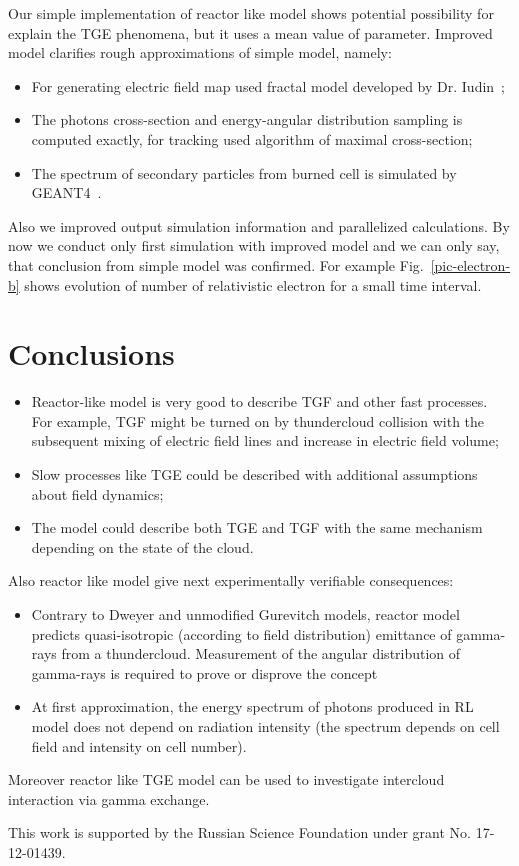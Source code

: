 \documentclass[%
 aip,
cp,  %
 amsmath,amssymb,%
 reprint,%
]{revtex4-2}
\begin{document}
Our simple implementation of reactor like model shows potential possibility for explain the TGE phenomena, but it uses a mean value of parameter. 
Improved model clarifies rough approximations of simple model, namely:
\begin{itemize}
	\item For generating electric field map used fractal model developed by Dr. Iudin~\cite{Iudin:2018};
	\item The photons cross-section and energy-angular distribution sampling  is computed exactly, for tracking used algorithm of maximal cross-section;
	\item The spectrum of secondary particles from burned cell is simulated by GEANT4~\cite{ALLISON2016186}.
\end{itemize}

Also we improved output simulation information and parallelized calculations. By now we conduct only first simulation with improved model and we can only say, that conclusion from simple model  was confirmed. For example Fig.~\ref{pic-electron-b} shows evolution of number of relativistic electron for a small time interval.
\section{Conclusions}
\begin{itemize}
   	\item Reactor-like model is very good to describe TGF and other fast processes. For example, TGF might be turned on by thundercloud collision with the subsequent mixing of electric field lines and increase in electric field volume;
   	\item Slow processes like TGE could be described with additional assumptions about field dynamics;
   	\item The model could describe both TGE and TGF with the same mechanism depending on the state of the cloud.
\end{itemize}

Also reactor like model give next experimentally verifiable consequences:
\begin{itemize}
   	\item Contrary to Dweyer and unmodified Gurevitch models, reactor model predicts quasi-isotropic (according to field distribution) emittance of gamma-rays from a thundercloud. 	Measurement of the angular distribution of gamma-rays is required to prove or disprove the concept
   	\item At first approximation, the energy spectrum of photons produced in RL model does not depend on radiation intensity (the spectrum depends on cell field and intensity on cell number).
\end{itemize}
Moreover reactor like TGE model can be used to investigate intercloud interaction via gamma exchange.
\begin{acknowledgments}
This work is supported by the Russian Science Foundation under grant No. 17-12-01439.
\end{acknowledgments}
%
\end{document}
